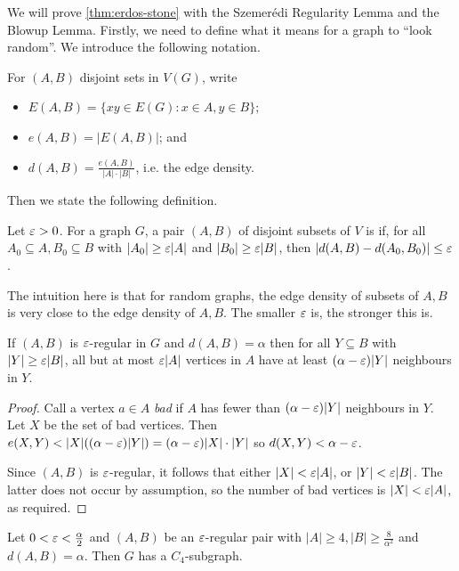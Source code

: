\documentclass[main.tex]{subfiles}
\begin{document}
We will prove \th\ref{thm:erdos-stone} with the Szemer\'edi Regularity Lemma
and the Blowup Lemma.
Firstly, we need to define what it means for a graph to ``look random''.
We introduce the following notation.
\begin{notation*}
  For $(A,B)$ disjoint sets in $V(G)$, write
  \begin{itemize}
    \item $E(A,B) = \{xy\in E(G) : x\in A, y\in B\}$;
    \item $e(A,B) = |E(A,B)|$; and
    \item $d(A,B) = \frac{e(A,B)}{|A|\cdot|B|}$, i.e. the edge density.
  \end{itemize}
\end{notation*}
Then we state the following definition.
\begin{definition*}
  Let $\varepsilon > 0$.
  For a graph $G$, a pair $(A,B)$ of disjoint subsets of $V$ is
   if, for all
  $A_0\subseteq A, B_0\subseteq B$ with $|A_0|\geq \varepsilon|A|$ and
  $|B_0|\geq\varepsilon|B|$, then $|d(A,B) - d(A_0,B_0)|\leq\varepsilon$.
\end{definition*}
The intuition here is that for random graphs, the edge density of subsets of
$A,B$ is very close to the edge density of $A,B$.
The smaller $\varepsilon$ is, the stronger this is.
\begin{lemma}
  If $(A,B)$ is $\varepsilon$-regular in $G$ and $d(A,B) = \alpha$ then for all
  $Y\subseteq B$ with $|Y|\geq\varepsilon|B|$, all but at most $\varepsilon|A|$ vertices in
  $A$ have at least $(\alpha - \varepsilon)|Y|$ neighbours in $Y$.
\end{lemma}
\begin{proof}
  Call a vertex $a\in A$ \textit{bad} if $A$ has fewer than $(\alpha - \varepsilon)|Y|$
  neighbours in $Y$.
  Let $X$ be the set of bad vertices.
  Then $e(X,Y) < |X|((\alpha-\varepsilon)|Y|) = (\alpha - \varepsilon)|X|\cdot|Y|$
  so $d(X,Y) < \alpha - \varepsilon$.

  Since $(A,B)$ is $\varepsilon$-regular, it follows that either $|X| < \varepsilon|A|$,
  or $|Y| < \varepsilon|B|$.
  The latter does not occur by assumption, so the number of bad vertices is
  $|X| < \varepsilon|A|$, as required.
\end{proof}
\begin{proposition}
  Let $0 < \varepsilon < \frac{\alpha}{2}$ and $(A,B)$ be an $\varepsilon$-regular pair with
  $|A|\geq 4, |B|\geq\frac{8}{\alpha^2}$ and $d(A,B) = \alpha$.
  Then $G$ has a $C_4$-subgraph.
\end{proposition}
\end{document}
